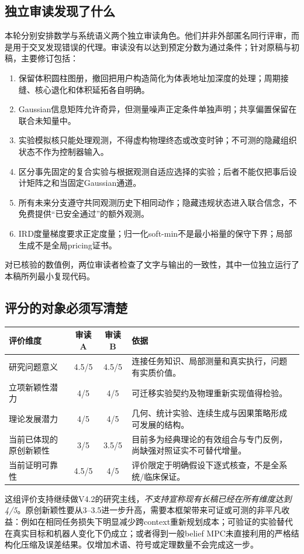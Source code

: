 \documentclass[11pt,a4paper]{article}
\numberwithin{equation}{section}
\theoremstyle{definition}
\begin{document}
\subsection{独立审读发现了什么}
本轮分别安排数学与系统语义两个独立审读角色。他们并非外部匿名同行评审，而是用于交叉发现错误的代理。审读没有以达到预定分数为通过条件；针对原稿与初稿，主要修订包括：
\begin{enumerate}
 \item 保留体积圆柱图册，撤回把用户构造简化为体表地址加深度的处理；周期接缝、核心退化和体积延拓各自明确。
 \item Gaussian信息矩阵允许奇异，但测量噪声正定条件单独声明；共享偏置保留在联合未知量中。
 \item 实验模拟核只能处理观测，不得虚构物理终态或改变时钟；不可测的隐藏组织状态不作为控制器输入。
 \item 区分事先固定的复合实验与根据观测自适应选择的实验；后者不能仅把事后设计矩阵之和当固定Gaussian通道。
 \item 所有未来分支遵守共同观测历史下相同动作；隐藏违规状态进入联合信念，不免费提供“已安全通过”的额外观测。
 \item IRD度量梯度要求正定度量；归一化soft-min不是最小裕量的保守下界；局部生成不是全局pricing证书。
\end{enumerate}
对已核验的数值例，两位审读者检查了文字与输出的一致性，其中一位独立运行了本稿所列最小复现代码。

\subsection{评分的对象必须写清楚}
\begin{center}\small
\begin{tabularx}{\linewidth}{p{.30\linewidth}ccY}
\toprule 评价维度 & 审读A & 审读B & 依据\\\midrule
研究问题意义 & 4.5/5 & 4.5/5 & 连接任务知识、局部测量和真实执行，问题有实质价值。\\
立项新颖性潜力 & 4/5 & 4/5 & 可迁移实验契约及物理重新实现值得检验。\\
理论发展潜力 & 4/5 & 4/5 & 几何、统计实验、连续生成与因果策略形成可发展的结构。\\
当前已体现的原创新颖性 & 3/5 & 3.5/5 & 目前多为经典理论的有效组合与专门反例，尚缺强对照证实不可替代增量。\\
当前证明可靠性 & 4.5/5 & 4/5 & 评价限定于明确假设下逐式核查，不是全系统/临床保证。\\\bottomrule
\end{tabularx}
\end{center}
这组评价支持继续做V4.2的研究主线，\emph{不支持宣称现有长稿已经在所有维度达到4/5}。原创新颖性要从3--3.5进一步升高，需要本框架带来可证或可测的非平凡收益：例如在相同任务损失下明显减少跨context重新规划成本；可验证的实验替代在真实目标和机器人变化下仍成立；或者得到一般belief MPC未直接利用的严格结构化压缩及误差结果。仅增加术语、符号或定理数量不会完成这一步。
\end{document}
